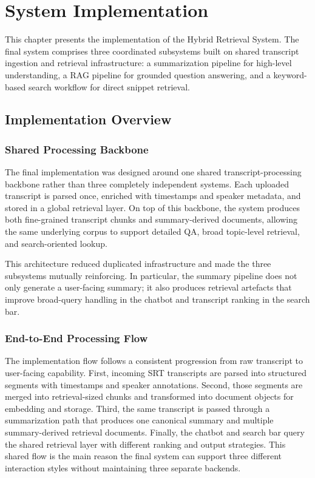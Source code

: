 \chapter{System Implementation}
This chapter presents the implementation of the Hybrid Retrieval System. The final system comprises three coordinated subsystems built on shared transcript ingestion and retrieval infrastructure: a summarization pipeline for high-level understanding, a RAG pipeline for grounded question answering, and a keyword-based search workflow for direct snippet retrieval.

\section{Implementation Overview}
\subsection{Shared Processing Backbone}
The final implementation was designed around one shared transcript-processing backbone rather than three completely independent systems. Each uploaded transcript is parsed once, enriched with timestamps and speaker metadata, and stored in a global retrieval layer. On top of this backbone, the system produces both fine-grained transcript chunks and summary-derived documents, allowing the same underlying corpus to support detailed QA, broad topic-level retrieval, and search-oriented lookup.

This architecture reduced duplicated infrastructure and made the three subsystems mutually reinforcing. In particular, the summary pipeline does not only generate a user-facing summary; it also produces retrieval artefacts that improve broad-query handling in the chatbot and transcript ranking in the search bar.

\subsection{End-to-End Processing Flow}
The implementation flow follows a consistent progression from raw transcript to user-facing capability. First, incoming SRT transcripts are parsed into structured segments with timestamps and speaker annotations. Second, those segments are merged into retrieval-sized chunks and transformed into document objects for embedding and storage. Third, the same transcript is passed through a summarization path that produces one canonical summary and multiple summary-derived retrieval documents. Finally, the chatbot and search bar query the shared retrieval layer with different ranking and output strategies. This shared flow is the main reason the final system can support three different interaction styles without maintaining three separate backends.


